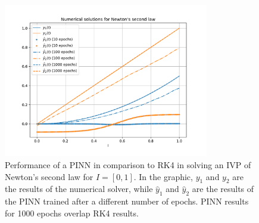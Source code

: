 \begin{figure}[h]
    \centering
    \includegraphics[width=0.8\textwidth]{images/pinn_newton.pdf}
    \caption{Performance of a \gls{PINN} in comparison to \gls{RK4} in solving an \gls{IVP} of Newton's second law for $I=\left[ 0,1 \right] $. In the graphic, $y_1$ and $y_2$ are the results of the numerical solver, while $\hat{y}_1$ and $\hat{y}_2$ are the results of the \gls{PINN} trained after a different number of epochs. \gls{PINN} results for 1000 epochs overlap \gls{RK4} results.}
    \label{fig:images-pinn_newton-pdf}
\end{figure}

